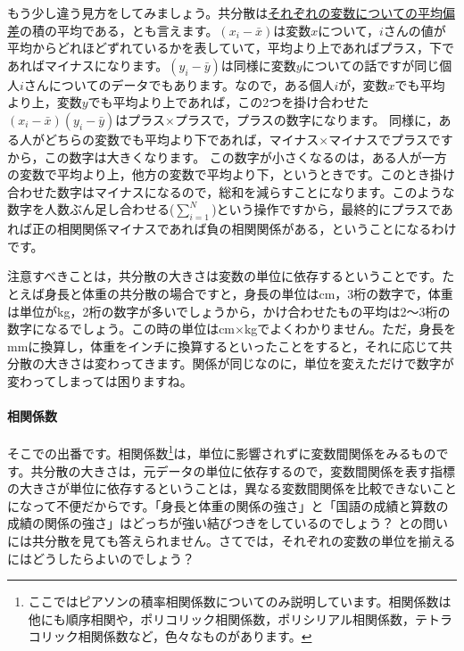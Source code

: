 \documentclass{ltjbook}
\begin{document}
もう少し違う見方をしてみましょう。共分散は\uline{それぞれの変数についての平均偏差}の積の平均である，とも言えます。$(x_i - \bar{x})$は変数$x$について，$i$さんの値が平均からどれほどずれているかを表していて，平均より上であればプラス，下であればマイナスになります。$(y_i - \bar{y})$は同様に変数$y$についての話ですが同じ個人$i$さんについてのデータでもあります。なので，ある個人$i$が，変数$x$でも平均より上，変数$y$でも平均より上であれば，この2つを掛け合わせた$(x_i - \bar{x})(y_i - \bar{y})$はプラス$\times$プラスで，プラスの数字になります。
同様に，ある人がどちらの変数でも平均より下であれば，マイナス$\times$マイナスでプラスですから，この数字は大きくなります。
この数字が小さくなるのは，ある人が一方の変数で平均より上，他方の変数で平均より下，というときです。このとき掛け合わせた数字はマイナスになるので，総和を減らすことになります。このような数字を人数ぶん足し合わせる($\sum_{i=1}^N$)という操作ですから，最終的にプラスであれば正の相関関係マイナスであれば負の相関関係がある，ということになるわけです。

注意すべきことは，共分散の大きさは変数の単位に依存するということです。たとえば身長と体重の共分散の場合ですと，身長の単位はcm，3桁の数字で，体重は単位がkg，2桁の数字が多いでしょうから，かけ合わせたもの平均は2〜3桁の数字になるでしょう。この時の単位はcm$\times$kgでよくわかりません。ただ，身長をmmに換算し，体重をインチに換算するといったことをすると，それに応じて共分散の大きさは変わってきます。関係が同じなのに，単位を変えただけで数字が変わってしまっては困りますね。

\paragraph{相関係数}そこでの出番です。相関係数\footnote{ここではピアソンの積率相関係数についてのみ説明しています。相関係数は他にも順序相関や，ポリコリック相関係数，ポリシリアル相関係数，テトラコリック相関係数など，色々なものがあります。}は，単位に影響されずに変数間関係をみるものです。共分散の大きさは，元データの単位に依存するので，変数間関係を表す指標の大きさが単位に依存するということは，異なる変数間関係を比較できないことになって不便だからです。「身長と体重の関係の強さ」と「国語の成績と算数の成績の関係の強さ」はどっちが強い結びつきをしているのでしょう？ との問いには共分散を見ても答えられません。さてでは，それぞれの変数の単位を揃えるにはどうしたらよいのでしょう？
\end{document}
